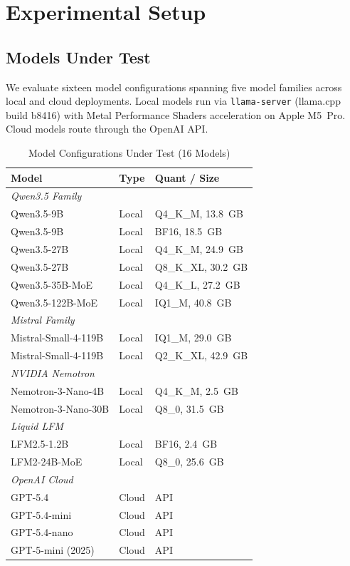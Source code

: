 \documentclass[onecolumn,10pt]{IEEEtran}
\begin{document}
\section{Experimental Setup}

\subsection{Models Under Test}

We evaluate sixteen model configurations spanning five model families
across local and cloud deployments. Local models run via
\texttt{llama-server} (llama.cpp build b8416) with Metal Performance
Shaders acceleration on Apple M5~Pro. Cloud models route through the
OpenAI API.

\begin{table}[h]
\centering
\caption{Model Configurations Under Test (16 Models)}
\label{tab:models}
\small
\begin{tabular}{p{3.4cm}p{1.0cm}p{2.0cm}}
\toprule
\textbf{Model} & \textbf{Type} & \textbf{Quant / Size} \\
\midrule
\multicolumn{3}{l}{\textit{Qwen3.5 Family}} \\
Qwen3.5-9B & Local & Q4\_K\_M, 13.8~GB \\
Qwen3.5-9B & Local & BF16, 18.5~GB \\
Qwen3.5-27B & Local & Q4\_K\_M, 24.9~GB \\
Qwen3.5-27B & Local & Q8\_K\_XL, 30.2~GB \\
Qwen3.5-35B-MoE & Local & Q4\_K\_L, 27.2~GB \\
Qwen3.5-122B-MoE & Local & IQ1\_M, 40.8~GB \\
\multicolumn{3}{l}{\textit{Mistral Family}} \\
Mistral-Small-4-119B & Local & IQ1\_M, 29.0~GB \\
Mistral-Small-4-119B & Local & Q2\_K\_XL, 42.9~GB \\
\multicolumn{3}{l}{\textit{NVIDIA Nemotron}} \\
Nemotron-3-Nano-4B & Local & Q4\_K\_M, 2.5~GB \\
Nemotron-3-Nano-30B & Local & Q8\_0, 31.5~GB \\
\multicolumn{3}{l}{\textit{Liquid LFM}} \\
LFM2.5-1.2B & Local & BF16, 2.4~GB \\
LFM2-24B-MoE & Local & Q8\_0, 25.6~GB \\
\multicolumn{3}{l}{\textit{OpenAI Cloud}} \\
GPT-5.4 & Cloud & API \\
GPT-5.4-mini & Cloud & API \\
GPT-5.4-nano & Cloud & API \\
GPT-5-mini (2025) & Cloud & API \\
\bottomrule
\end{tabular}
\end{table}
\end{document}
